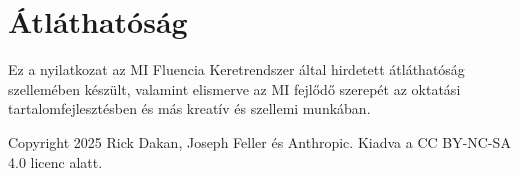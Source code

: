 \documentclass[a4paper, 12pt]{article}
\begin{document}
\section*{Átláthatóság}
Ez a nyilatkozat az MI Fluencia Keretrendszer által hirdetett átláthatóság szellemében készült, valamint elismerve az MI fejlődő szerepét az oktatási tartalomfejlesztésben és más kreatív és szellemi munkában.

\vspace{\fill}
\begin{center}
    \small{Copyright 2025 Rick Dakan, Joseph Feller és Anthropic. Kiadva a CC BY-NC-SA 4.0 licenc alatt.}
\end{center}
\end{document}

